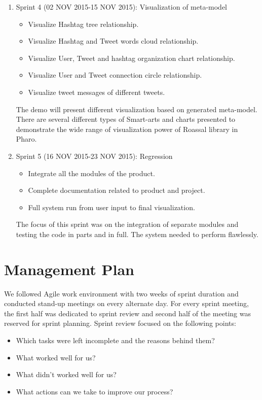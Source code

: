 \documentclass[11pt]{article}
\begin{document}
\begin{enumerate}
\item Sprint 4 (02 NOV 2015-15 NOV 2015): Visualization of meta-model
\begin{itemize}
\item Visualize Hashtag tree relationship. 

\item Visualize Hashtag and Tweet words cloud relationship. 

\item Visualize User, Tweet and hashtag organization chart relationship. 

\item Visualize User and Tweet connection circle relationship. 

\item Visualize tweet messages of different tweets. 
\end{itemize}
The demo will present different visualization based on generated meta-model. There are several different types of Smart-arts and charts presented to demonstrate the wide range of visualization power of Roassal library in Pharo. 

\item Sprint 5 (16 NOV 2015-23 NOV 2015): Regression
\begin{itemize}
\item Integrate all the modules of the product.
\item Complete documentation related to product and project.
\item Full system run from user input to final visualization.
\end{itemize}
The focus of this sprint was on the integration of separate modules and testing the code in parts and in full. The system needed to perform flawlessly.
\end{enumerate}



\section{Management Plan}
We followed Agile work environment with two weeks of sprint duration and conducted stand-up meetings on every alternate day. For every sprint meeting, the first half was dedicated to sprint review and second half of the meeting was reserved for sprint planning. Sprint review focused on the following points: 
\begin{itemize}
\item Which tasks were left incomplete and the reasons behind them? 
\item What worked well for us?
\item What didn't worked well for us?
\item What actions can we take to improve our process?
\end{itemize}
\end{document}
